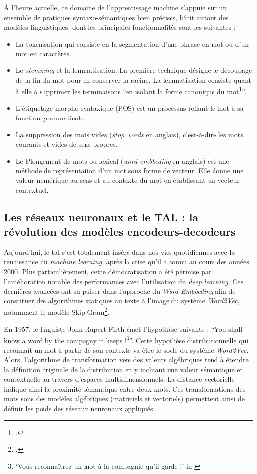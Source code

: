 	À l’heure actuelle, ce domaine de l'apprentissage machine s'appuie sur un ensemble de pratiques syntaxo-sémantiques bien précises, bâtit autour des modèles linguistiques, dont les principales fonctionnalités sont les suivantes :
	\begin{itemize}
	    \item La tokenisation qui consiste en la segmentation d'une phrase en mot ou d'un mot en caractères.
	    \item Le \textit{stemming} et la lemmatisation. La première technique désigne le découpage de la fin du mot pour en conserver la racine. La lemmatisation consiste quant à elle à supprimer les terminaisons \enquote{en isolant la forme canonique du mot\footcite{labbeNormalisationLemmatisationQuestion}}.
	    \item L’étiquetage morpho-syntaxique (POS) est un processus reliant le mot à sa fonction grammaticale.
	    \item La suppression des mots vides (\textit{stop words} en anglais), c’est-à-dire les mots courants et vides de sens propres.
	    \item Le Plongement de mots ou lexical (\textit{word embbeding} en anglais) est une méthode de représentation d'un mot sous forme de vecteur. Elle donne une valeur numérique au sens et au contexte du mot en établissant un vecteur contextuel.
	\end{itemize}
	
	\subsection{Les réseaux neuronaux et le TAL : la révolution des modèles encodeurs-decodeurs}
	
	Aujourd'hui, le \gls{tal} s'est totalement inséré dans nos vies quotidiennes avec la renaissance du \textit{machine learning}, après la crise qu'il a connu au cours des années 2000. Plus particulièrement, cette démocratisation a été permise par l'amélioration notable des performances avec l'utilisation du \textit{deep learning}. Ces dernières avancées ont su puiser dans l'approche du \textit{Word Embbeding} afin de constituer des algorithmes statiques au texte à l'image du système \textit{Word2Vec}, notamment le modèle Skip-Gram\footcite[D'autres valorisent des approches moins lourdes de plongement de mots tel que le \textit{Singular Value Decomposition}][]{moodyStopUsingWord2vec2017}. 
	
	En 1957, le linguiste John Rupert Firth émet l'hypothèse suivante : \enquote{You shall know a word by the compagny it keeps !\footnote{\enquote{Vous reconnaîtrez un mot à la compagnie qu'il garde !} in \cite{widdowsonFirth1957Papers2007}}}. Cette hypothèse distributionnelle qui reconnaît un mot à partir de son contexte va être le socle du système \textit{Word2Vec}. Alors, l'algorithme de transformation vers des valeurs algébriques tend à étendre la définition originale de la distribution en y incluant une valeur sémantique et contextuelle au travers d'espaces multidimensionnels. La distance vectorielle indique ainsi la proximité sémantique entre deux mots. Ces transformations des mots sous des modèles algébriques (matriciels et vectoriels) permettent ainsi de définir les poids des réseaux neuronaux appliqués.
	
